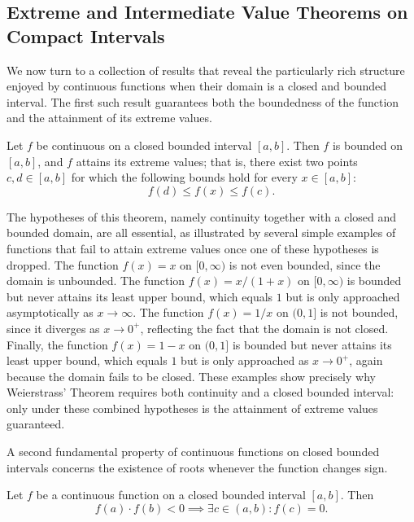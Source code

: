 \subsection{Extreme and Intermediate Value Theorems on Compact Intervals}


We now turn to a collection of results that reveal the particularly rich structure enjoyed by continuous functions when their domain is a closed and bounded interval. The first such result guarantees both the boundedness of the function and the attainment of its extreme values.

\begin{theorem}
Let $f$ be continuous on a closed bounded interval $[a,b]$. Then $f$ is bounded on $[a,b]$, and $f$ attains its extreme values; that is, there exist two points $c, d \in [a,b]$ for which the following bounds hold for every $x \in [a,b]$:
\[
f(d) \leq f(x) \leq f(c).
\]

\end{theorem}

The hypotheses of this theorem, namely continuity together with a closed and bounded domain, are all essential, as illustrated by several simple examples of functions that fail to attain extreme values once one of these hypotheses is dropped. The function $f(x) = x$ on $[0, \infty)$ is not even bounded, since the domain is unbounded. The function $f(x) = x/(1+x)$ on $[0, \infty)$ is bounded but never attains its least upper bound, which equals $1$ but is only approached asymptotically as $x \to \infty$. The function $f(x) = 1/x$ on $(0,1]$ is not bounded, since it diverges as $x \to 0^+$, reflecting the fact that the domain is not closed. Finally, the function $f(x) = 1 - x$ on $(0,1]$ is bounded but never attains its least upper bound, which equals $1$ but is only approached as $x \to 0^+$, again because the domain fails to be closed. These examples show precisely why Weierstrass' Theorem requires both continuity and a closed bounded interval: only under these combined hypotheses is the attainment of extreme values guaranteed.


A second fundamental property of continuous functions on closed bounded intervals concerns the existence of roots whenever the function changes sign.

\begin{theorem}
Let $f$ be a continuous function on a closed bounded interval $[a,b]$. Then
\[
f(a) \cdot f(b) < 0 \implies \exists c \in (a,b) : f(c) = 0.
\]

\end{theorem}

